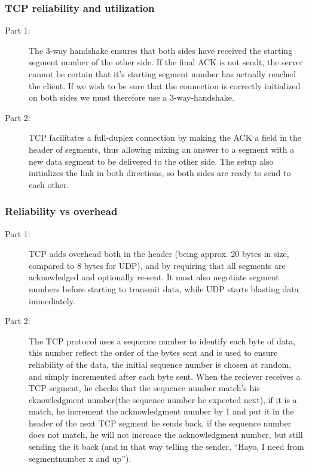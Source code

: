 \subsubsection{TCP reliability and utilization}
\begin{description}
    \item[Part 1:] The 3-way handshake ensures that both sides have received
        the starting segment number of the other side. If the final ACK is not
        sendt, the server cannot be certain that it's starting segment number
        has actually reached the client. If we wish to be sure that the
        connection is correctly initialized on both sides we must therefore use
        a 3-way-handshake.
    \item[Part 2:] TCP facilitates a full-duplex connection by making the ACK a
        field in the header of segments, thus allowing mixing an answer to a
        segment with a new data segment to be delivered to the other side. The
        setup also initializes the link in both directions, so both sides are
        ready to send to each other.
\end{description}

\subsubsection{Reliability vs overhead}
\begin{description}
    \item[Part 1:] TCP adds overhead both in the header (being approx. 20 bytes
        in size, compared to 8 bytes for UDP), and by requiring that all
        segments are acknowledged and optionally re-sent. It must also
        negotiate segment numbers before starting to transmit data, while UDP
        starts blasting data immediately.
    \item[Part 2:] The TCP protocol uses a sequence number to identify each
        byte of data, this number reflect the order of the bytes sent and is
        used to ensure reliability of the data, the initial sequence number is
        chosen at random, and simply incremented after each byte sent. When the
        reciever receives a TCP segment, he checks that the sequence number
        match's his cknowledgment number(the sequence number he expected
        next), if it is a match, he increment the acknowledgment number by 1 and
        put it in the header of the next TCP segment he sends back, if the
        sequence number does not match, he will not increace the acknowledgment
        number, but still sending the it back (and in that way telling the
        sender, ``Hayo, I need from segmentnumber x and up'').
\end{description}


